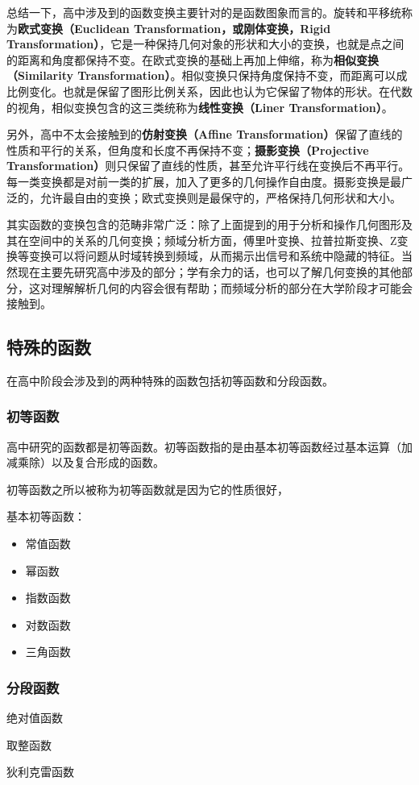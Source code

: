 总结一下，高中涉及到的函数变换主要针对的是函数图象而言的。旋转和平移统称为\textbf{欧式变换（Euclidean Transformation，或刚体变换，Rigid Transformation）}，它是一种保持几何对象的形状和大小的变换，也就是点之间的距离和角度都保持不变。在欧式变换的基础上再加上伸缩，称为\textbf{相似变换（Similarity Transformation）}。相似变换只保持角度保持不变，而距离可以成比例变化。也就是保留了图形比例关系，因此也认为它保留了物体的形状。在代数的视角，相似变换包含的这三类统称为\textbf{线性变换（Liner Transformation）}。

另外，高中不太会接触到的\textbf{仿射变换（Affine Transformation）}保留了直线的性质和平行的关系，但角度和长度不再保持不变；\textbf{摄影变换（Projective Transformation）}则只保留了直线的性质，甚至允许平行线在变换后不再平行。每一类变换都是对前一类的扩展，加入了更多的几何操作自由度。摄影变换是最广泛的，允许最自由的变换；欧式变换则是最保守的，严格保持几何形状和大小。

其实函数的变换包含的范畴非常广泛：除了上面提到的用于分析和操作几何图形及其在空间中的关系的几何变换；频域分析方面，傅里叶变换、拉普拉斯变换、Z变换等变换可以将问题从时域转换到频域，从而揭示出信号和系统中隐藏的特征。当然现在主要先研究高中涉及的部分；学有余力的话，也可以了解几何变换的其他部分，这对理解解析几何的内容会很有帮助；而频域分析的部分在大学阶段才可能会接触到。


\subsection{特殊的函数}

在高中阶段会涉及到的两种特殊的函数包括初等函数和分段函数。

\subsubsection{初等函数}

高中研究的函数都是初等函数。初等函数指的是由基本初等函数经过基本运算（加减乘除）以及复合形成的函数。

初等函数之所以被称为初等函数就是因为它的性质很好，

基本初等函数：
\begin{itemize}
\item 常值函数
\item 幂函数
\item 指数函数
\item 对数函数
\item 三角函数
\end{itemize}

\subsubsection{分段函数}

绝对值函数

取整函数

狄利克雷函数